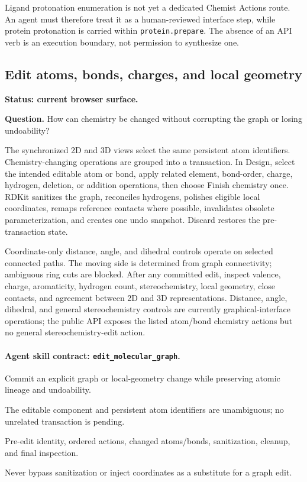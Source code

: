 \begin{small}
Ligand protonation enumeration is not yet a dedicated Chemist Actions route. An agent must therefore treat it as a human-reviewed interface step, while protein protonation is carried within \texttt{protein.prepare}. The absence of an API verb is an execution boundary, not permission to synthesize one.

\subsection{Edit atoms, bonds, charges, and local geometry}\label{appB:edit}

\textbf{Status: current browser surface.}

\textbf{Question.} How can chemistry be changed without corrupting the graph or losing undoability?

The synchronized 2D and 3D views select the same persistent atom identifiers. Chemistry-changing operations are grouped into a transaction. In Design, select the intended editable atom or bond, apply related element, bond-order, charge, hydrogen, deletion, or addition operations, then choose Finish chemistry once. RDKit sanitizes the graph, reconciles hydrogens, polishes eligible local coordinates, remaps reference contacts where possible, invalidates obsolete parameterization, and creates one undo snapshot. Discard restores the pre-transaction state.

Coordinate-only distance, angle, and dihedral controls operate on selected connected paths. The moving side is determined from graph connectivity; ambiguous ring cuts are blocked. After any committed edit, inspect valence, charge, aromaticity, hydrogen count, stereochemistry, local geometry, close contacts, and agreement between 2D and 3D representations. Distance, angle, dihedral, and general stereochemistry controls are currently graphical-interface operations; the public API exposes the listed atom/bond chemistry actions but no general stereochemistry-edit action.

\paragraph{Agent skill contract: \texttt{edit\_molecular\_graph}.}

\begin{description}[leftmargin=2.2cm,style=nextline]
\item[Goal] Commit an explicit graph or local-geometry change while preserving atomic lineage and undoability.
\item[Preconditions] The editable component and persistent atom identifiers are unambiguous; no unrelated transaction is pending.
\item[Evidence] Pre-edit identity, ordered actions, changed atoms/bonds, sanitization, cleanup, and final inspection.
\item[Stop] Never bypass sanitization or inject coordinates as a substitute for a graph edit.
\end{description}


\end{small}

